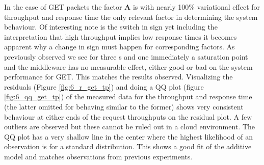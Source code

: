     In the case of GET packets the factor \textbf{A} is with nearly 100\% variational effect for throughput and
    response time the only relevant factor in determining the system behaviour. Of interesting note is the switch in
    sign yet including the interpretation that high throughput implies low response times it becomes apparent why a
    change in sign must happen for corresponding factors. As previously observed we see for three \cli{}s and one
    \srv{} immediately a saturation point and the middleware has no measurable effect, either good or bad on the
    system performance for GET. This matches the results observed. Visualizing the residuals (Figure
    \ref{fig:6_r_get_tp}) and doing a QQ plot (figure \ref{fig:6_qq_get_tp}) of the measured data for the
    throughput and response time (the latter omitted for behaving similar to the former) shows very consistent
    behaviour at either ends of the request throughputs on the residual plot. A few outliers are observed but these
    cannot be ruled out in a cloud environment. The QQ plot has a very shallow line in the center where the highest
    likelihood of an observation is for a standard distribution. This shows a good fit of the additive model and matches
    observations from previous experiments.

